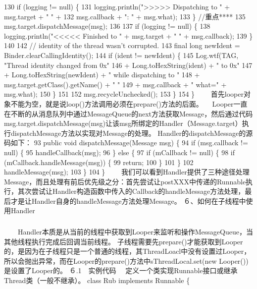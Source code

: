\documentclass[9pt, b5paper]{article}
\begin{document}
130            if (logging != null) \{
131                logging.println(">>>>> Dispatching to " + msg.target + " " +
132                        msg.callback + ": " + msg.what);
133            \}
//重点****
135            msg.target.dispatchMessage(msg);
136
137            if (logging != null) \{
138                logging.println("<<<<< Finished to " + msg.target + " " + msg.callback);
139            \}
140
142            // identity of the thread wasn't corrupted.
143            final long newIdent = Binder.clearCallingIdentity();
144            if (ident != newIdent) \{
145                Log.wtf(TAG, "Thread identity changed from 0x"
146                        + Long.toHexString(ident) + " to 0x"
147                        + Long.toHexString(newIdent) + " while dispatching to "
148                        + msg.target.getClass().getName() + " "
149                        + msg.callback + " what=" + msg.what);
150            \}
151
152            msg.recycleUnchecked();
153        \}
154    \}
 　　首先looper对象不能为空，就是说loop()方法调用必须在prepare()方法的后面。
　Looper一直在不断的从消息队列中通过MessageQueue的next方法获取Message，然后通过代码msg.target.dispatchMessage(msg)让该msg所绑定的Handler（Message.target）执行dispatchMessage方法以实现对Message的处理。 
Handler的dispatchMessage的源码如下：
93     public void dispatchMessage(Message msg) \{
94         if (msg.callback != null) \{
95             handleCallback(msg);
96         \} else \{
97             if (mCallback != null) \{
98                 if (mCallback.handleMessage(msg)) \{
99                     return;
100                \}
101            \}
102            handleMessage(msg);
103        \}
104    \}
 　　我们可以看到Handler提供了三种途径处理Message，而且处理有前后优先级之分：首先尝试让postXXX中传递的Runnable执行，其次尝试让Handler构造函数中传入的Callback的handleMessage方法处理，最后才是让Handler自身的handleMessage方法处理Message。
 ６、如何在子线程中使用Handler
\subsubsection{}
\label{sec-6-0-6}
  　　Handler本质是从当前的线程中获取到Looper来监听和操作MessageQueue，当其他线程执行完成后回调当前线程。
子线程需要先prepare()才能获取到Looper的，是因为在子线程只是一个普通的线程，其ThreadLoacl中没有设置过Looper，所以会抛出异常，而在Looper的prepare()方法中sThreadLocal.set(new Looper())是设置了Looper的。
６.1　实例代码
　定义一个类实现Runnable接口或继承Thread类（一般不继承）。
    class Rub implements Runnable \{  
\end{document}
